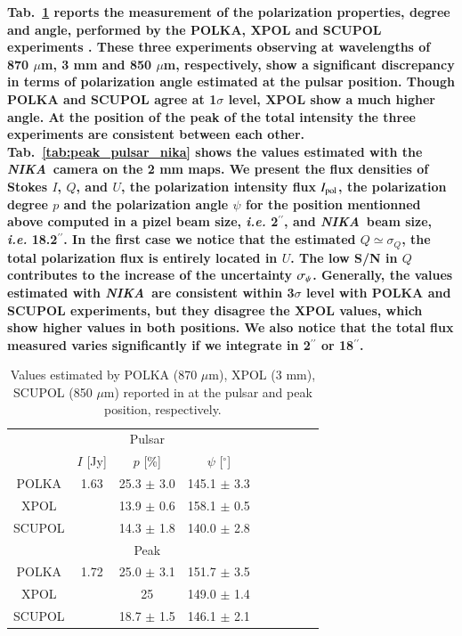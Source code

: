 \documentclass[twocolumn,traditabstract]{aa}
\def\NIKA{\textit{NIKA}}
\begin{document}
\textbf{Tab.~\ref{tab:peak_pulsar_others} reports the measurement of the polarization properties, degree and angle, performed by the POLKA, XPOL and SCUPOL experiments \cite{2014PASP..126.1027W}.
These three experiments observing at wavelengths of 870 $\mu$m, 3 mm and 850 $\mu$m, respectively, show a significant discrepancy in terms of polarization angle estimated at the pulsar position.
Though POLKA and SCUPOL agree at 1$\sigma$ level, XPOL show a much higher angle. At the position of the peak of the total intensity the three experiments are consistent between each other.
Tab.~\ref{tab:peak_pulsar_nika} shows the values estimated with the \NIKA\ camera on the 2 mm maps. We present the flux densities of Stokes $I$, $Q$, and $U$, the polarization intensity flux $I_{\rm pol}$,
the polarization degree $p$ and the polarization angle $\psi$ for the position mentionned above computed in a pizel beam size, {\it i.e.} 2$^{\prime\prime}$, and \NIKA\ beam size, {\it i.e.} 18.2$^{\prime\prime}$.
In the first case we notice that the estimated $Q\simeq\sigma_Q$, the total polarization flux is entirely located in $U$. The low S/N in $Q$ contributes to the increase of the uncertainty $\sigma_{ \rm\psi}$. 
Generally, the values estimated with \NIKA\ are consistent within 3$\sigma$ level with POLKA and SCUPOL experiments, but they disagree the XPOL values, which show higher values in both positions. We also notice that the total flux measured varies significantly if we integrate in 2$^{\prime\prime}$ or 18$^{\prime\prime}$.} 

 \begin{table}
  \centering
      \begin{tabular}{ccccccccc}
      \hline
      \hline
      & &  Pulsar & & \\
       & $I$ [Jy]& $p$ [\%] & $\psi$ [$^\circ$] & \\ 
       \hline
      POLKA & 1.63 & 25.3 $\pm$ 3.0 & 145.1 $\pm$ 3.3 & \\
      XPOL  &  & 13.9 $\pm$ 0.6 & 158.1 $\pm$ 0.5 &  \\
      SCUPOL & & 14.3 $\pm$ 1.8 & 140.0 $\pm$ 2.8& \\
      \hline
      \hline
       & &  Peak & & \\
       \hline
      POLKA & 1.72 & 25.0 $\pm$ 3.1 & 151.7 $\pm$ 3.5 &  \\
      XPOL  & & 25 & 149.0 $\pm $ 1.4 &  \\
      SCUPOL & & 18.7 $\pm$ 1.5 & 146.1 $\pm$ 2.1&\\
     \hline            
    \hline   
    \end{tabular}
   \caption{ Values estimated by POLKA (870 $\mu$m), XPOL (3 mm), SCUPOL (850 $\mu$m) reported in \cite{2014PASP..126.1027W} at the pulsar and peak position, respectively. }
\label{tab:peak_pulsar_others}
 \end{table}
\end{document}
